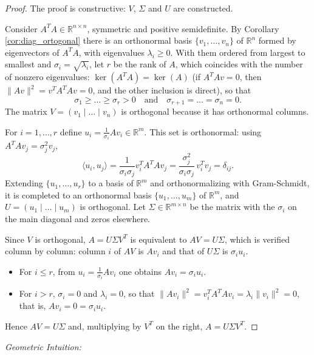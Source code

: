 \documentclass[11pt, a4paper]{article}
\begin{document}
\begin{proof}
The proof is constructive: $V$, $\Sigma$ and $U$ are constructed.

Consider $A^T A \in \mathbb{R}^{n \times n}$, symmetric and positive semidefinite. By Corollary \ref{cor:diag_ortogonal} there is an orthonormal basis $\{v_1, \dots, v_n\}$ of $\mathbb{R}^n$ formed by eigenvectors of $A^T A$, with eigenvalues $\lambda_i \ge 0$. With them ordered from largest to smallest and $\sigma_i = \sqrt{\lambda_i}$, let $r$ be the rank of $A$, which coincides with the number of nonzero eigenvalues: $\ker(A^T A) = \ker(A)$ (if $A^T A v = 0$, then $\|Av\|^2 = v^T A^T A v = 0$, and the other inclusion is direct), so that
\[ \sigma_1 \ge \dots \ge \sigma_r > 0 \quad \text{and} \quad \sigma_{r+1} = \dots = \sigma_n = 0. \]
The matrix $V = (v_1 \mid \dots \mid v_n)$ is orthogonal because it has orthonormal columns.

For $i = 1, \dots, r$ define $u_i = \frac{1}{\sigma_i} A v_i \in \mathbb{R}^m$. This set is orthonormal: using $A^T A v_j = \sigma_j^2 v_j$,
\[ \langle u_i, u_j \rangle = \frac{1}{\sigma_i \sigma_j} v_i^T A^T A v_j = \frac{\sigma_j^2}{\sigma_i \sigma_j}\, v_i^T v_j = \delta_{ij}. \]
Extending $\{u_1, \dots, u_r\}$ to a basis of $\mathbb{R}^m$ and orthonormalizing with Gram-Schmidt, it is completed to an orthonormal basis $\{u_1, \dots, u_m\}$ of $\mathbb{R}^m$, and $U = (u_1 \mid \dots \mid u_m)$ is orthogonal. Let $\Sigma \in \mathbb{R}^{m \times n}$ be the matrix with the $\sigma_i$ on the main diagonal and zeros elsewhere.

Since $V$ is orthogonal, $A = U \Sigma V^T$ is equivalent to $A V = U \Sigma$, which is verified column by column: column $i$ of $AV$ is $A v_i$ and that of $U \Sigma$ is $\sigma_i u_i$.
\begin{itemize}
    \item For $i \le r$, from $u_i = \frac{1}{\sigma_i} A v_i$ one obtains $A v_i = \sigma_i u_i$.
    \item For $i > r$, $\sigma_i = 0$ and $\lambda_i = 0$, so that $\|A v_i\|^2 = v_i^T A^T A v_i = \lambda_i \|v_i\|^2 = 0$, that is, $A v_i = 0 = \sigma_i u_i$.
\end{itemize}
Hence $A V = U \Sigma$ and, multiplying by $V^T$ on the right, $A = U \Sigma V^T$.
\end{proof}

\obs \textit{Geometric Intuition:}
\end{document}
